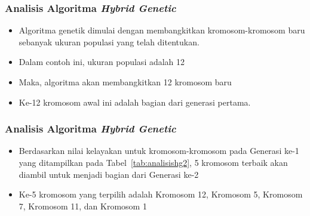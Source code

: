 \documentclass{beamer}
\begin{document}
\note{

}

\begin{frame}
\frametitle{Analisis Algoritma \textit{Hybrid Genetic}}
\begin{itemize}
\item Algoritma genetik dimulai dengan membangkitkan kromosom-kromosom baru sebanyak ukuran populasi yang telah ditentukan.
\item Dalam contoh ini, ukuran populasi adalah 12
\item Maka, algoritma akan membangkitkan 12 kromosom baru
\item Ke-12 kromosom awal ini adalah bagian dari generasi pertama.
\end{itemize}
\end{frame}


\begin{frame}
\frametitle{Analisis Algoritma \textit{Hybrid Genetic}}
\begin{itemize}
\item Berdasarkan nilai kelayakan untuk kromosom-kromosom pada Generasi ke-1 yang ditampilkan pada Tabel~\ref{tab:analisishg2}, 5 kromosom terbaik akan diambil untuk menjadi bagian dari Generasi ke-2
\item Ke-5 kromosom yang terpilih adalah Kromosom 12, Kromosom 5, Kromosom 7, Kromosom 11, dan Kromosom 1
\end{itemize}
\end{frame}

\end{document}
